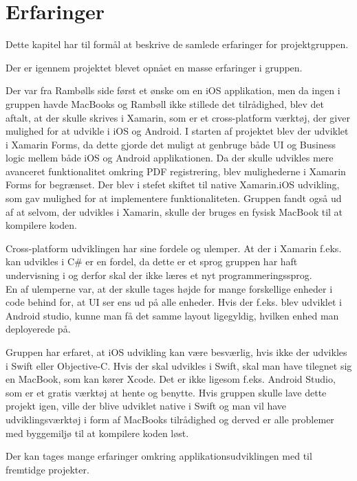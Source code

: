 \chapter{Erfaringer}
Dette kapitel har til formål at beskrive de samlede erfaringer for projektgruppen. 

Der er igennem projektet blevet opnået en masse erfaringer i gruppen.

Der var fra Rambølls side først et ønske om en iOS applikation, men da ingen i gruppen havde MacBooks og Rambøll ikke stillede det tilrådighed, blev det aftalt, at der skulle skrives i Xamarin, som er et cross-platform værktøj, der giver mulighed for at udvikle i iOS og Android.
I starten af projektet blev der udviklet i Xamarin Forms, da dette gjorde det muligt at genbruge både UI og Business logic mellem både iOS og Android applikationen. Da der skulle udvikles mere avanceret funktionalitet omkring PDF registrering, blev mulighederne i Xamarin Forms for begrænset\cite{Forms}. Der blev i stefet skiftet til native Xamarin.iOS udvikling, som gav mulighed for at implementere funktionaliteten.
Gruppen fandt også ud af at selvom, der udvikles i Xamarin, skulle der bruges en fysisk MacBook til at kompilere koden.

Cross-platform udviklingen har sine fordele og ulemper. At der i Xamarin f.eks. kan udvikles i C\# er en fordel, da dette er et sprog gruppen har haft undervisning i og derfor skal der ikke læres et nyt programmeringssprog. \\
En af ulemperne var, at der skulle tages højde for mange forskellige enheder i code behind for, at UI ser ens ud på alle enheder. Hvis der f.eks. blev udviklet i Android studio, kunne man få det samme layout ligegyldig, hvilken enhed man deployerede på.

Gruppen har erfaret, at iOS udvikling kan være besværlig, hvis ikke der udvikles i Swift\cite{Swift} eller Objective-C\cite{ObjC}. Hvis der skal udvikles i Swift, skal man have tilegnet sig en MacBook, som kan kører Xcode\cite{Xcode}. Det er ikke ligesom f.eks. Android Studio, som er et gratis værktøj at hente og benytte.
Hvis gruppen skulle lave dette projekt igen, ville der blive udviklet native i Swift og man vil have udviklingsværktøj i form af MacBooks tilrådighed og derved er alle problemer med byggemiljø til at kompilere koden løst.

Der kan tages mange erfaringer omkring applikationsudviklingen med til fremtidge projekter. \\